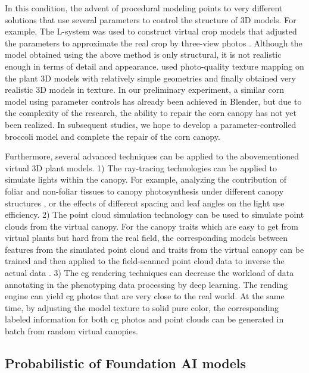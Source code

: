 In this condition, the advent of procedural modeling points to very different solutions that use several parameters to control the structure of 3D models. For example, The L-system was used to construct virtual crop models that adjusted the parameters to approximate the real crop by three-view photos \mbox{\citep{cieslak_l-system_2021}}.
Although the model obtained using the above method is only structural, it is not realistic enough in terms of detail and appearance. \citet{mikami_hidden_2022} used photo-quality texture mapping on the plant 3D models with relatively simple geometries and finally obtained very realistic 3D models in texture. In our preliminary experiment, a similar corn model using parameter controls has already been achieved in Blender, but due to the complexity of the research, the ability to repair the corn canopy has not yet been realized. In subsequent studies, we hope to develop a parameter-controlled broccoli model and complete the repair of the corn canopy.

Furthermore, several advanced techniques can be applied to the abovementioned virtual 3D plant models. 1) The ray-tracing technologies can be applied to simulate lights within the canopy. For example, analyzing the contribution of foliar and non-foliar tissues to canopy photosynthesis under different canopy structures \mbox{\citep{chang_3dcap_2022}}, or the effects of different spacing \mbox{\citep{he_modeling_2021}} and leaf angles \mbox{\citep{liu_canopy_2021}} on the light use efficiency. 2) The point cloud simulation technology can be used to simulate point clouds from the virtual canopy. For the canopy traits which are easy to get from virtual plants but hard from the real field, the corresponding models between features from the simulated point cloud and traits from the virtual canopy can be trained and then applied to the field-scanned point cloud data to inverse the actual data \citep{liu_estimating_2017}. 3) The \gls{cg} rendering techniques can decrease the workload of data annotating in the phenotyping data processing by deep learning. The rending engine can yield \gls{cg} photos that are very close to the real world. At the same time, by adjusting the model texture to solid pure color, the corresponding labeled information for both \gls{cg} photos \citep{mikami_hidden_2022} and point clouds \citep{chaudhury_3d_2020} can be generated in batch from random virtual canopies.

\subsection{Probabilistic of Foundation AI models}


